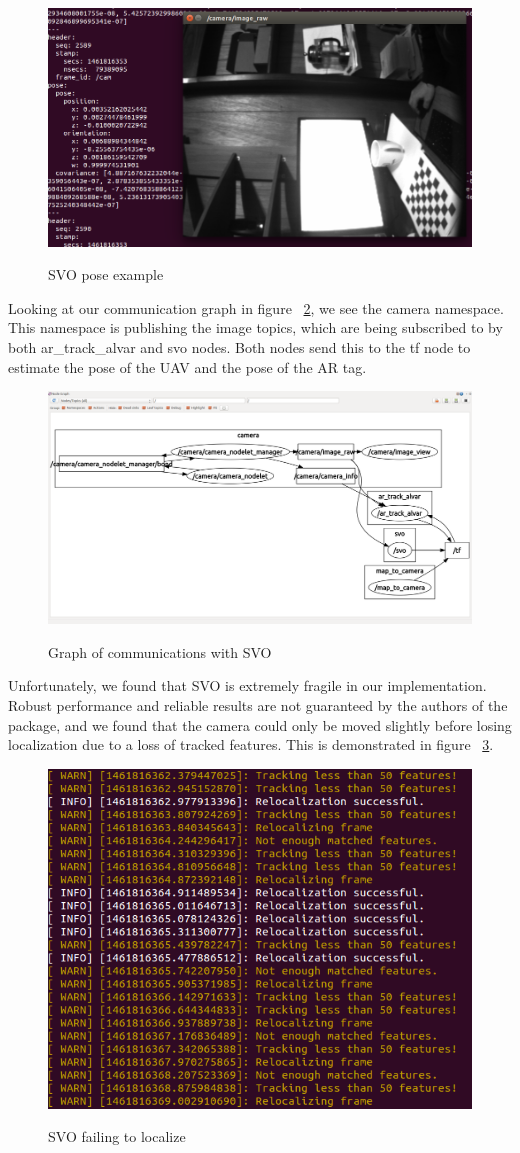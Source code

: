 \begin{itemize}
\begin{figure}[H]
\caption{SVO pose example}
\centering
\includegraphics[width=.75\textwidth]{images/svo}
\label{svo}
\end{figure} 

Looking at our communication graph in figure ~\ref{svo_graph}, we see the camera namespace. This namespace is publishing the image topics, which are being subscribed to by both ar\_track\_alvar and svo nodes. Both nodes send this to the tf node to estimate the pose of the UAV and the pose of the AR tag. \\

\begin{figure}[h]
\caption{Graph of communications with SVO}
\centering
\includegraphics[width=.75\textwidth]{images/svo_graph}
\label{svo_graph}
\end{figure} 

Unfortunately, we found that SVO is extremely fragile in our implementation. Robust performance and reliable results are not guaranteed by the authors of the package, and we found that the camera could only be moved slightly before losing localization due to a loss of tracked features. This is demonstrated in figure ~\ref{svo_break}.\\
 
\begin{figure}[H]
\caption{SVO failing to localize}
\centering
\includegraphics[width=.5\textwidth]{images/svo_break}
\label{svo_break}
\end{figure} 


\end{itemize}
